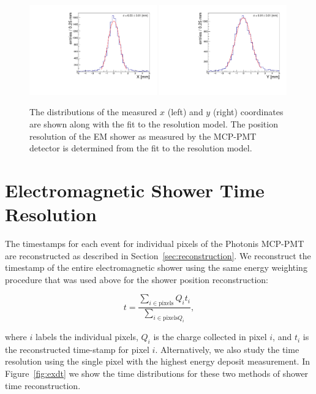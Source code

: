 \documentclass[12pt]{article}
\begin{document}
\begin{figure}[htbp] \centering
\includegraphics[width=0.49\textwidth]{Images/XYResolution/X_Resolution_fixedTrigger.pdf}
\includegraphics[width=0.49\textwidth]{Images/XYResolution/Y_Resolution_fixedTrigger.pdf}
\caption{The distributions of the measured $x$ (left) and $y$ (right)
coordinates are shown along with the fit to the resolution model. The position
resolution of the EM shower as measured by the MCP-PMT detector is determined from
the fit to the resolution model. } \label{fig:ResolutionMeasurement}
\end{figure}

\section{ Electromagnetic Shower Time Resolution } 
\label{sec:timing} 

The timestamps for each event for individual pixels of the Photonis MCP-PMT are
reconstructed as described in Section~\ref{sec:reconstruction}. We reconstruct
the timestamp of the entire electromagnetic shower using the same energy
weighting procedure that was used above for the shower position reconstruction:

\begin{equation} t =\frac{\sum_{i\in\mathrm{pixels}} Q_{i} t_{i}}
{\sum_{i\in\mathrm{pixels} Q_{i}}}, 
\label{eqn:EnergyWeightedTimestamp}
\end{equation} 

where $i$ labels the individual pixels, $Q_{i}$ is the charge
collected in pixel $i$, and $t_{i}$ is the reconstructed time-stamp for pixel
$i$. Alternatively, we also study the time resolution using the single pixel
with the highest energy deposit measurement. In Figure~\ref{fig:exdt} we show
the time distributions for these two methods of shower time reconstruction.
\end{document}
